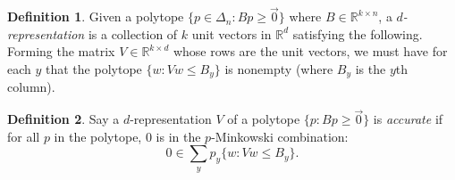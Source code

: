 \documentclass[12pt]{article}
\theoremstyle{definition}
\newtheorem{definition}{Definition}
\newcommand{\reals}{\mathbb{R}}
\begin{document}
\begin{definition}
  Given a polytope $\{p \in \Delta_n : B p \geq \vec{0}\}$ where $B \in \reals^{k \times n}$, a \emph{$d$-representation} is a collection of $k$ unit vectors in $\reals^d$ satisfying the following.
  Forming the matrix $V \in \reals^{k \times d}$ whose rows are the unit vectors, we must have for each $y$ that the polytope $\{ w : Vw \leq B_y \}$ is nonempty (where $B_y$ is the $y$th column).
\end{definition}

\begin{definition}
  Say a $d$-representation $V$ of a polytope $\{p : Bp \geq \vec{0}\}$ is \emph{accurate} if for all $p$ in the polytope, $0$ is in the $p$-Minkowski combination:
  \[ 0 \in \sum_y p_y \{w : Vw \leq B_y \} . \]
\end{definition}
\end{document}
